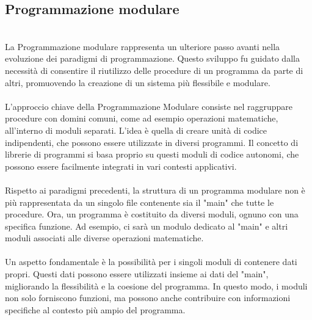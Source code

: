 \documentclass{report}
\begin{document}
\subsection{Programmazione modulare}
\\
La Programmazione modulare rappresenta un ulteriore passo avanti nella evoluzione dei paradigmi di programmazione. Questo sviluppo fu guidato dalla necessità di consentire il riutilizzo delle procedure di un programma da parte di altri, promuovendo la creazione di un sistema più flessibile e modulare.
\\
\\
L'approccio chiave della Programmazione Modulare consiste nel raggruppare procedure con domini comuni, come ad esempio operazioni matematiche, all'interno di moduli separati. L'idea è quella di creare unità di codice indipendenti, che possono essere utilizzate in diversi programmi. Il concetto di librerie di programmi si basa proprio su questi moduli di codice autonomi, che possono essere facilmente integrati in vari contesti applicativi.
\\
\\
Rispetto ai paradigmi precedenti, la struttura di un programma modulare non è più rappresentata da un singolo file contenente sia il "main" che tutte le procedure. Ora, un programma è costituito da diversi moduli, ognuno con una specifica funzione. Ad esempio, ci sarà un modulo dedicato al "main" e altri moduli associati alle diverse operazioni matematiche.
\\
\\
Un aspetto fondamentale è la possibilità per i singoli moduli di contenere dati propri. Questi dati possono essere utilizzati insieme ai dati del "main", migliorando la flessibilità e la coesione del programma. In questo modo, i moduli non solo forniscono funzioni, ma possono anche contribuire con informazioni specifiche al contesto più ampio del programma.
\\
\end{document}
